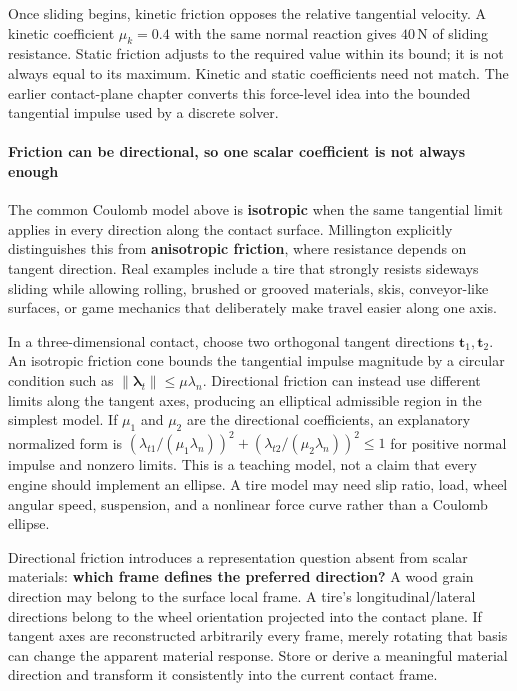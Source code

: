 Once sliding begins, kinetic friction opposes the relative tangential velocity. A kinetic coefficient \(\mu_k=0.4\) with the same normal reaction gives \(40\,\mathrm N\) of sliding resistance. Static friction adjusts to the required value within its bound; it is not always equal to its maximum. Kinetic and static coefficients need not match. The earlier contact-plane chapter converts this force-level idea into the bounded tangential impulse used by a discrete solver.

\paragraph{Friction can be directional, so one scalar coefficient is not always enough}\label{friction-can-be-directional-so-one-scalar-coefficient-is-not-always-enough}

The common Coulomb model above is \textbf{isotropic} when the same tangential limit applies in every direction along the contact surface. Millington explicitly distinguishes this from \textbf{anisotropic friction}, where resistance depends on tangent direction. Real examples include a tire that strongly resists sideways sliding while allowing rolling, brushed or grooved materials, skis, conveyor-like surfaces, or game mechanics that deliberately make travel easier along one axis.

In a three-dimensional contact, choose two orthogonal tangent directions \(\mathbf{t}_1,\mathbf{t}_2\). An isotropic friction cone bounds the tangential impulse magnitude by a circular condition such as \(\|\boldsymbol{\lambda}_t\|\le\mu\lambda_n\). Directional friction can instead use different limits along the tangent axes, producing an elliptical admissible region in the simplest model. If \(\mu_1\) and \(\mu_2\) are the directional coefficients, an explanatory normalized form is \((\lambda_{t1}/(\mu_1\lambda_n))^2+(\lambda_{t2}/(\mu_2\lambda_n))^2\le1\) for positive normal impulse and nonzero limits. This is a teaching model, not a claim that every engine should implement an ellipse. A tire model may need slip ratio, load, wheel angular speed, suspension, and a nonlinear force curve rather than a Coulomb ellipse.

Directional friction introduces a representation question absent from scalar materials: \textbf{which frame defines the preferred direction?} A wood grain direction may belong to the surface local frame. A tire's longitudinal/lateral directions belong to the wheel orientation projected into the contact plane. If tangent axes are reconstructed arbitrarily every frame, merely rotating that basis can change the apparent material response. Store or derive a meaningful material direction and transform it consistently into the current contact frame.

